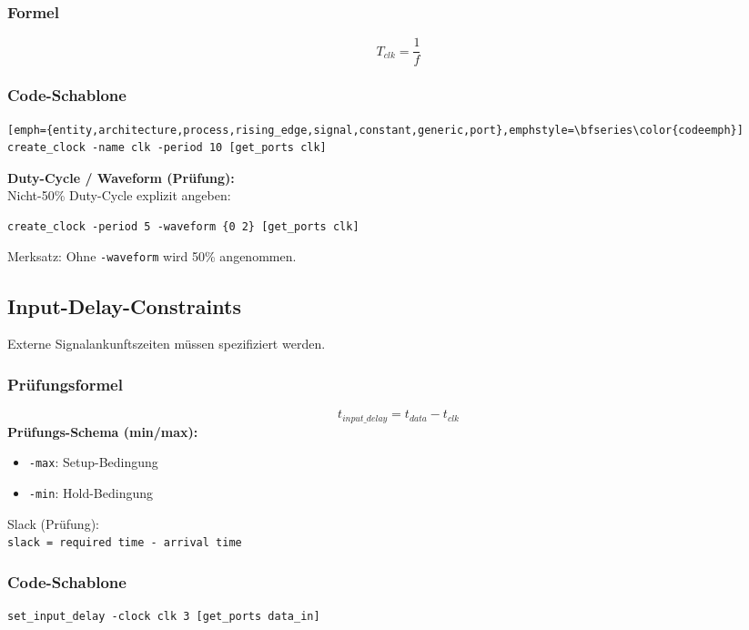 \documentclass[10pt,a4paper]{article}
\begin{document}
\begin{multicols}{3}
\subsubsection*{Formel}
\[
T_{clk} = \frac{1}{f}
\]

\subsubsection*{Code-Schablone}
\begin{lstlisting}[emph={entity,architecture,process,rising_edge,signal,constant,generic,port},emphstyle=\bfseries\color{codeemph}][emph={entity,architecture,process,rising_edge,signal,constant,generic,port},emphstyle=\bfseries\color{codeemph}]
create_clock -name clk -period 10 [get_ports clk]
\end{lstlisting}

\textbf{Duty-Cycle / Waveform (Prüfung):}\\
Nicht-50\% Duty-Cycle explizit angeben:
\begin{lstlisting}
create_clock -period 5 -waveform {0 2} [get_ports clk]
\end{lstlisting}
Merksatz: Ohne \texttt{-waveform} wird 50\% angenommen.

\subsection{Input-Delay-Constraints}
Externe Signalankunftszeiten müssen spezifiziert werden.

\subsubsection*{\textcolor{codeemph}{Prüfungsformel}}
\[
t_{input\_delay} = t_{data} - t_{clk}
\]
\textbf{Prüfungs-Schema (min/max):}
\begin{itemize}
  \item \texttt{-max}: Setup-Bedingung
  \item \texttt{-min}: Hold-Bedingung
\end{itemize}
Slack (Prüfung): \\
\texttt{slack = required time - arrival time}

\subsubsection*{Code-Schablone}
\begin{lstlisting}[emph={entity,architecture,process,rising_edge,signal,constant,generic,port},emphstyle=\bfseries\color{codeemph}]
set_input_delay -clock clk 3 [get_ports data_in]
\end{lstlisting}


\end{multicols}
\end{document}
